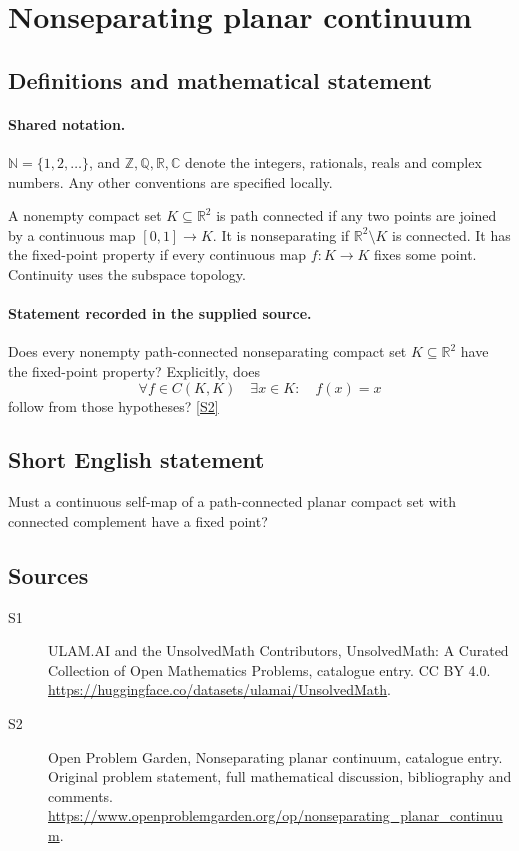 \documentclass[11pt]{article}
\newcommand{\sref}[2]{\hyperlink{source:#1:#2}{[S#2]}}
\begin{document}
\section{Nonseparating planar continuum}\label{statement}

\subsection{Definitions and mathematical statement}

\paragraph{Shared notation.}$\mathbb N=\{1,2,\ldots\}$, and $\mathbb Z,\mathbb Q,\mathbb R,\mathbb C$ denote the integers, rationals, reals and complex numbers. Any other conventions are specified locally.


A nonempty compact set $K\subseteq\mathbb R^2$ is path connected if any two points are joined by a continuous map $[0,1]\to K$. It is nonseparating if $\mathbb R^2\setminus K$ is connected. It has the fixed-point property if every continuous map $f:K\to K$ fixes some point. Continuity uses the subspace topology.
\paragraph{Statement recorded in the supplied source.}
Does every nonempty path-connected nonseparating compact set $K\subseteq\mathbb R^2$ have the fixed-point property? Explicitly, does
\[
 \forall f\in C(K,K)\quad\exists x\in K:\quad f(x)=x
\]
follow from those hypotheses? \sref{statement}{2}
\subsection{Short English statement}
Must a continuous self-map of a path-connected planar compact set with connected complement have a fixed point?
\subsection{Sources}
\begin{description}
\item[\hypertarget{source:statement:1}{S1}] ULAM.AI and the UnsolvedMath Contributors, UnsolvedMath: A Curated Collection of Open Mathematics Problems, catalogue entry. CC BY 4.0. \url{https://huggingface.co/datasets/ulamai/UnsolvedMath}.
\item[\hypertarget{source:statement:2}{S2}] Open Problem Garden, Nonseparating planar continuum, catalogue entry. Original problem statement, full mathematical discussion, bibliography and comments. \url{https://www.openproblemgarden.org/op/nonseparating_planar_continuum}.
\end{description}
\label{end:statement}
\end{document}
